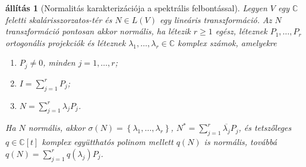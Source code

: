 \documentclass[a4paper, showtrims]{memoir}
\theoremstyle{plain}
\newtheorem{proposition}{állítás}[chapter]
\theoremstyle{remark}
\theoremstyle{definition}
\begin{document}
\begin{proposition}[Normalitás karakterizációja a spektrális felbontással]
	Legyen $V$ egy $\mathbb{C}$ feletti skaláris\-szor\-zatos-tér és $N\in L\left( V \right)$ egy lineáris transzformáció.
	Az $N$ transzformáció pontosan akkor normális,
	ha létezik $r\geq 1$ egész, léteznek $P_1,\ldots,P_r$ ortogonális projekciók és
	léteznek $\lambda_1,\ldots,\lambda_r\in\mathbb{C}$ komplex számok,
	amelyekre
	\begin{enumerate}
		\item $P_j\neq 0$, minden $j=1,\ldots,r$;
		\item $I=\sum_{j=1}^rP_j$;
		\item $N=\sum_{j=1}^r\lambda_jP_j$.
	\end{enumerate}
	Ha $N$ normális,
	akkor $\sigma\left( N \right)=\left\{ \lambda_1,\ldots,\lambda_r \right\}$,
	$N^\ast=\sum_{j=1}^r\overline{\lambda_j}P_j$,
	és tetszőleges $q\in\mathbb{C}[t]$ komplex együtthatós polinom mellett
	$q\left( N \right)$ is normális,
	továbbá
	$q\left( N \right)=\sum_{j=1}^rq\left( \lambda_j \right)P_j$.
\end{proposition}
\end{document}
